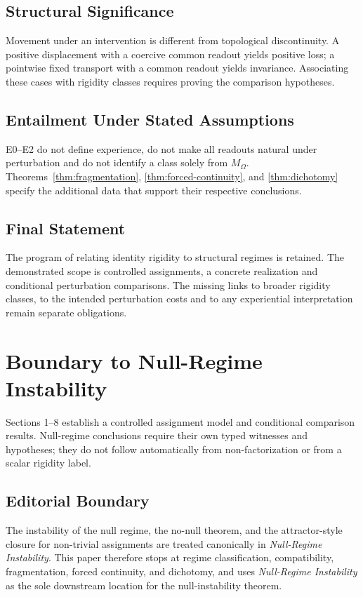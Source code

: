 \documentclass[11pt,a4paper]{article}
\theoremstyle{plain}
\theoremstyle{definition}
\theoremstyle{remark}
\begin{document}
\subsection{Structural Significance}
Movement under an intervention is different from topological discontinuity. A positive displacement with a coercive common readout yields positive loss; a pointwise fixed transport with a common readout yields invariance. Associating these cases with rigidity classes requires proving the comparison hypotheses.

\subsection{Entailment Under Stated Assumptions}
E0--E2 do not define experience, do not make all readouts natural under perturbation and do not identify a class solely from $M_\Omega$. Theorems~\ref{thm:fragmentation}, \ref{thm:forced-continuity}, and \ref{thm:dichotomy} specify the additional data that support their respective conclusions.

\subsection{Final Statement}
The program of relating identity rigidity to structural regimes is retained. The demonstrated scope is controlled assignments, a concrete realization and conditional perturbation comparisons. The missing links to broader rigidity classes, to the intended perturbation costs and to any experiential interpretation remain separate obligations.

\section{Boundary to Null-Regime Instability}

Sections 1--8 establish a controlled assignment model and conditional comparison results. Null-regime conclusions require their own typed witnesses and hypotheses; they do not follow automatically from non-factorization or from a scalar rigidity label.

\subsection{Editorial Boundary}

The instability of the null regime, the no-null theorem, and the attractor-style closure for non-trivial assignments are treated canonically in \textit{Null-Regime Instability}. This paper therefore stops at regime classification, compatibility, fragmentation, forced continuity, and dichotomy, and uses \textit{Null-Regime Instability} as the sole downstream location for the null-instability theorem.
\end{document}
